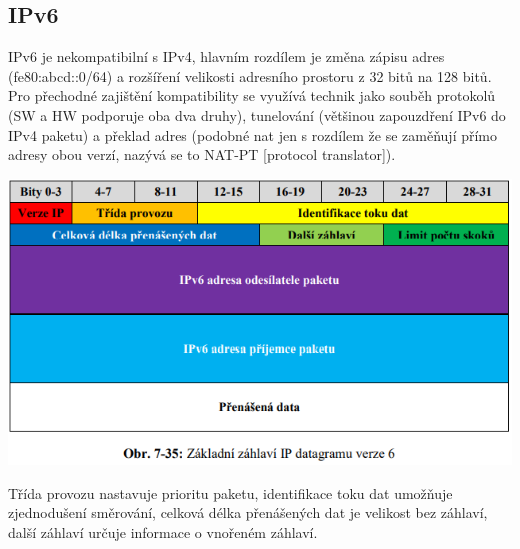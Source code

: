 \subsection{IPv6}

IPv6 je nekompatibilní s IPv4, hlavním rozdílem je změna zápisu adres (fe80:abcd::0/64) a rozšíření velikosti adresního prostoru z 32 bitů na 128 bitů. Pro přechodné zajištění kompatibility se využívá technik jako souběh protokolů (SW a HW podporuje oba dva druhy), tunelování (většinou zapouzdření IPv6 do IPv4 paketu) a překlad adres (podobné nat jen s rozdílem že se zaměňují přímo adresy obou verzí, nazývá se to NAT-PT [protocol translator]).

\begin{center}
	\includegraphics[scale=0.5]{images/-046.png}
\end{center}

Třída provozu nastavuje prioritu paketu, identifikace toku dat umožňuje zjednodušení směrování, celková délka přenášených dat je velikost bez záhlaví, další záhlaví určuje informace o vnořeném záhlaví.

